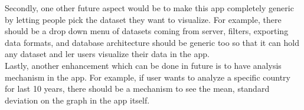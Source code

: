 Secondly, one other future aspect would be to make this app completely generic by letting people pick the dataset they want to visualize. For example, there should be a drop down menu of datasets coming from server, filters, exporting data formats, and database architecture should be generic too so that it can hold any dataset and ler users visualize their data in the app. \\

Lastly, another enhancement which can be done in future is to have analysis mechanism in the app. For example, if user wants to analyze a specific country for last 10 years, there should be a mechanism to see the mean, standard deviation on the graph in the app itself. 
